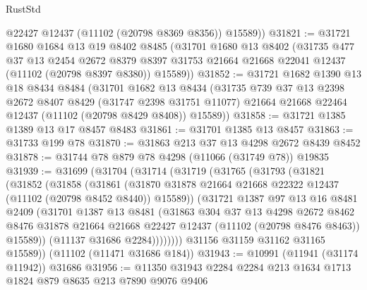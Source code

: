 \begin{lexlean}{RustStd}
\begin{coremodule}
        @22427
        @12437
        (@11102 (@20798 @8369 @8356))
        @15589))
@31821 := @31721
    @1680
    @1684
    @13
    @19
    @8402
    @8485
    (@31701
      @1680
      @13
      @8402
      (@31735
        @477
        @37
        @13
        @2454
        @2672
        @8379
        @8397
        @31753
        @21664
        @21668
        @22041
        @12437
        (@11102 (@20798 @8397 @8380))
        @15589))
@31852 := @31721
    @1682
    @1390
    @13
    @18
    @8434
    @8484
    (@31701
      @1682
      @13
      @8434
      (@31735
        @739
        @37
        @13
        @2398
        @2672
        @8407
        @8429
        (@31747 @2398 @31751 @11077)
        @21664
        @21668
        @22464
        @12437
        (@11102 (@20798 @8429 @8408))
        @15589))
@31858 := @31721 @1385 @1389 @13 @17 @8457 @8483
@31861 := @31701 @1385 @13 @8457
@31863 := @31733 @199 @78
@31870 := @31863 @213 @37 @13 @4298 @2672 @8439 @8452
@31878 := @31744 @78 @879 @78 @4298 (@11066 (@31749 @78)) @19835
@31939 := @31699
    (@31704
      (@31714
        (@31719
          (@31765
            (@31793
              (@31821
                (@31852
                  (@31858
                    (@31861
                      (@31870
                        @31878
                        @21664
                        @21668
                        @22322
                        @12437
                        (@11102 (@20798 @8452 @8440))
                        @15589))
                    (@31721
                      @1387
                      @97
                      @13
                      @16
                      @8481
                      @2409
                      (@31701
                        @1387
                        @13
                        @8481
                        (@31863
                          @304
                          @37
                          @13
                          @4298
                          @2672
                          @8462
                          @8476
                          @31878
                          @21664
                          @21668
                          @22427
                          @12437
                          (@11102 (@20798 @8476 @8463))
                          @15589))
                      (@11137 @31686 @2284))))))))
        @31156
        @31159
        @31162
        @31165
        @15589))
    (@11102 (@11471 @31686 @184))
@31943 := @10991 (@11941 (@31174 @11942)) @31686
@31956 := @11350 @31943 @2284 @2284 @213 @1634 @1713 @1824 @879 @8635 @213 @7890 @9076 @9406

\end{coremodule}
\end{lexlean}
